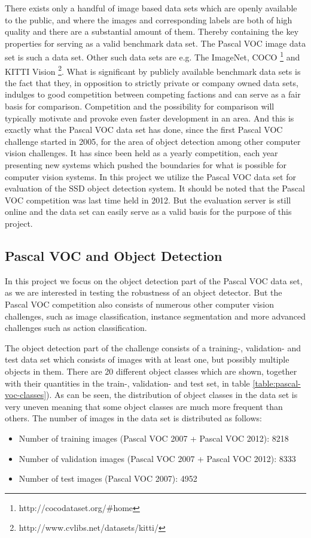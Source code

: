 \documentclass{article}
\begin{document}
There exists only a handful of image based data sets which are openly available to the public, and where the images and corresponding labels are both of high quality and there are a substantial amount of them. Thereby containing the key properties for serving as a valid benchmark data set. The Pascal VOC image data set is such a data set. Other such data sets are e.g. The ImageNet, COCO \footnote{http://cocodataset.org/\#home} and KITTI Vision \footnote{http://www.cvlibs.net/datasets/kitti/}. What is significant by publicly available benchmark data sets is the fact that they, in opposition to strictly private or company owned data sets, indulges to good competition between competing factions and can serve as a fair basis for comparison. Competition and the possibility for comparison will typically motivate and provoke even faster development in an area. And this is exactly what the Pascal VOC data set has done, since the first Pascal VOC challenge started in 2005, for the area of object detection among other computer vision challenges. It has since been held as a yearly competition, each year presenting new systems which pushed the boundaries for what is possible for computer vision systems. In this project we utilize the Pascal VOC data set for evaluation of the SSD object detection system. It should be noted that the Pascal VOC competition was last time held in 2012. But the evaluation server is still online and the data set can easily serve as a valid basis for the purpose of this project.  

\subsection{Pascal VOC and Object Detection}
In this project we focus on the object detection part of the Pascal VOC data set, as we are interested in testing the robustness of an object detector. But the Pascal VOC competition also consists of numerous other computer vision challenges, such as image classification, instance segmentation and more advanced challenges such as action classification. 

The object detection part of the challenge consists of a training-, validation- and test data set which consists of images with at least one, but possibly multiple objects in them. There are 20 different object classes which are shown, together with their quantities in the train-, validation- and test set, in table \ref{table:pascal-voc-classes}). As can be seen, the distribution of object classes in the data set is very uneven meaning that some object classes are much more frequent than others. The number of images in the data set is distributed as follows:
\begin{itemize}
	\setlength\itemsep{0.2em}
	\item Number of training images (Pascal VOC 2007 + Pascal VOC 2012): 8218
	\item Number of validation images (Pascal VOC 2007 + Pascal VOC 2012): 8333
	\item Number of test images (Pascal VOC 2007): 4952
\end{itemize}
\end{document}
